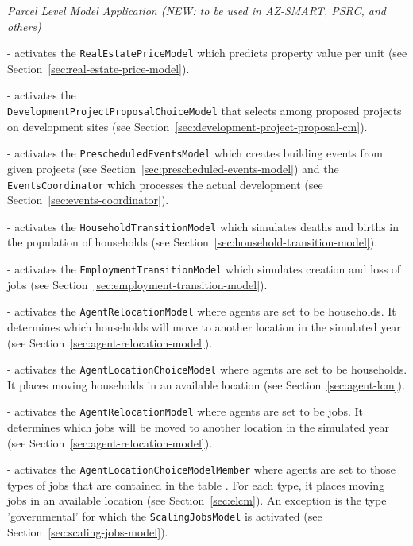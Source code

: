 \emph{Parcel Level Model Application (NEW: to be used in AZ-SMART, PSRC, and others)}
\begin{description}
  \tight
  \item[``real_estate_price_model''] - activates the \verb|RealEstatePriceModel| which
  predicts property value per unit (see Section~\ref{sec:real-estate-price-model}).
  \item[``development_project_proposal_choice_model''] - activates
  the \\ \verb|DevelopmentProjectProposalChoiceModel| that selects among
  proposed projects on development sites 
  (see Section~\ref{sec:development-project-proposal-cm}).
  \item[``prescheduled_events''] - activates the
  \verb|PrescheduledEventsModel| which creates building events from
  given projects (see Section~\ref{sec:prescheduled-events-model}) and
  the \verb|EventsCoordinator| which processes the actual development
  (see Section~\ref{sec:events-coordinator}).
  \item[``household_transition_model''] - activates the
  \verb|HouseholdTransitionModel| which simulates deaths and births in the
  population of households (see Section~\ref{sec:household-transition-model}).
  \item[``employment_transition_model''] - activates the
  \verb|EmploymentTransitionModel| which simulates creation and loss of jobs
  (see Section~\ref{sec:employment-transition-model}).
  \item[``household_relocation_model''] - activates the
  \verb|AgentRelocationModel| where agents are set to be households. It
  determines which households will move to another location in the simulated
  year (see Section~\ref{sec:agent-relocation-model}).
  \item[``household_location_choice_model''] - activates the
  \verb|AgentLocationChoiceModel| where agents are set to be households. It
  places moving households in an available location (see
  Section~\ref{sec:agent-lcm}).
  \item[``employment_relocation_model''] - activates the
  \verb|AgentRelocationModel| where agents are set to be jobs. It determines
  which jobs will be moved to another location in the simulated year (see
  Section~\ref{sec:agent-relocation-model}).
  \item[``employment_location_choice_model''] - activates the
  \verb|AgentLocationChoiceModelMember| where agents are set to those types of jobs
  that are contained in the table .
  For each type, it places moving jobs in an available location (see
  Section~\ref{sec:elcm}). An exception is the type 'governmental' for which the \verb|ScalingJobsModel| is activated
  (see Section~\ref{sec:scaling-jobs-model}).
\end{description}

